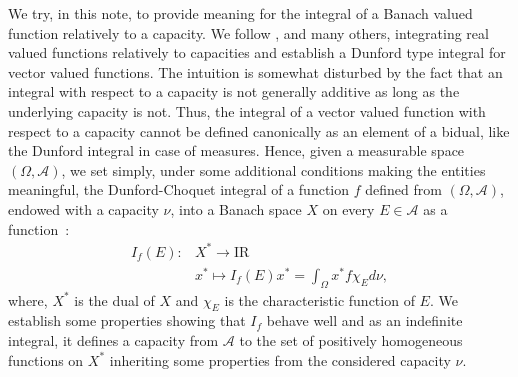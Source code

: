 \documentclass[preprint,authoryear,12pt]{article}%
\theoremstyle{definition}
\renewcommand{\AA}{{\mathcal A}}
\newcommand{\IR}{{\mathrm{I\!R}}}
\begin{document}
We try, in this note, to provide meaning for the integral of a Banach valued function relatively to a capacity. We follow \citet{CHO55,DEL71}, and many others, integrating real valued functions relatively to capacities and establish a  Dunford type integral for vector valued functions. The intuition is somewhat disturbed by the fact that an integral with respect to a capacity is not generally additive as long as the underlying capacity is not. Thus, the integral of a vector valued function with respect to a capacity cannot be defined canonically as an element of a bidual, like the  Dunford integral in case of measures. Hence, given a measurable space $(\Omega,\AA)$, we set simply, under some additional conditions making the entities meaningful, the  Dunford-Choquet integral of a function $f$ defined from $(\Omega,\AA)$, endowed with a capacity $\nu$, into a Banach space $X$ on every $E\in \AA$ as a function~: 
$$
\begin{array}{rl}
I_f(E) :&X^*\rightarrow \IR\\
&x^*\mapsto I_f(E)x^*=\int_\Omega x^* f \chi_E d\nu,
\end{array}
$$
where, $X^*$ is the dual of $X$ and $\chi_E$ is the characteristic function of $E$. We establish some properties showing that $I_f$ behave well and as an indefinite integral, it defines a capacity from $\AA$ to the set of positively homogeneous functions on $X^*$ inheriting some properties from the considered capacity $\nu$.   
\end{document}
